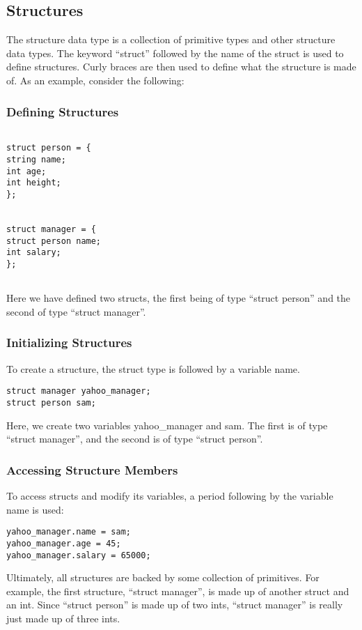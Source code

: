 \documentclass{article}
\begin{document}
\subsection{Structures}
The structure data type is a collection of primitive types and other structure data types. The keyword ``struct'' followed by the name of the struct is used to define structures. Curly braces are then used to define what the structure is made of. As an example, consider the following:

\subsubsection{Defining Structures}

\begin{lstlisting}

struct person = {
string name;
int age;
int height;
};


struct manager = {
struct person name;
int salary;
};


\end{lstlisting}
Here we have defined two structs, the first being of type ``struct person'' and the second of type ``struct manager''. 

\subsubsection{Initializing Structures}
To create a structure, the struct type is followed by a variable name. 
\begin{lstlisting}
struct manager yahoo_manager;
struct person sam;
\end{lstlisting}

Here, we create two variables yahoo\_manager and sam. The first is of type ``struct manager'', and the second is of type ``struct person''.

\subsubsection{Accessing Structure Members}

 To access structs and modify its variables, a period following by the variable name is used:

 \begin{lstlisting}
yahoo_manager.name = sam;
yahoo_manager.age = 45;
yahoo_manager.salary = 65000;
\end{lstlisting}

Ultimately, all structures are backed by some collection of primitives. For example, the first structure, ``struct manager'', is made up of another struct and an int. Since ``struct person'' is made up of two ints, ``struct manager'' is really just made up of three ints. 
\end{document}
